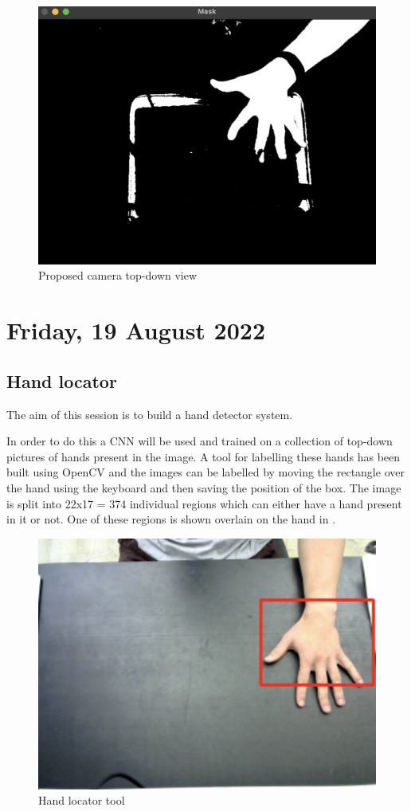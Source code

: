 \begin{figure}[h]
    \centering
    \includegraphics[width=0.7\linewidth]{figures/topdown_view.png}
    \caption{Proposed camera top-down view}
    \label{fig:topdown_view}
\end{figure}

\section[2022/08/19]{Friday, 19 August 2022}

\subsection{Hand locator}

The aim of this session is to build a hand detector system.

In order to do this a CNN will be used and trained on a collection of top-down pictures of hands present in the image. A tool for labelling these hands has been built using OpenCV and the images can be labelled by moving the rectangle over the hand using the keyboard and then saving the position of the box. The image is split into 22x17 = 374 individual regions which can either have a hand present in it or not. One of these regions is shown overlain on the hand in .

\begin{figure}[h]
    \centering
    \includegraphics[width=0.7\linewidth]{figures/hand_locator_tool.png}
    \caption{Hand locator tool}
    \label{fig:hand_locator_tool}
\end{figure}

